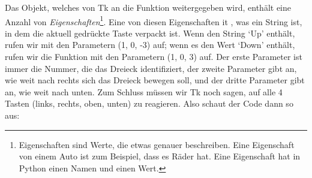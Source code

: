 Das Objekt, welches von Tk an die Funktion  weitergegeben wird, enthält eine Anzahl von \emph{Eigenschaften}\footnote{Eigenschaften sind Werte, die etwas genauer beschreiben. Eine Eigenschaft von einem Auto ist zum Beispiel, dass es Räder hat. Eine Eigenschaft hat in Python einen Namen und einen Wert.}. Eine von diesen Eigenschaften it , was ein String ist, in dem die aktuell gedrückte Taste verpackt ist. Wenn  den String `Up' enthält, rufen wir  mit den Parametern (1, 0, -3) auf; wenn es den Wert `Down' enthält, rufen wir die Funktion mit den Parametern (1, 0, 3) auf. Der erste Parameter ist immer die Nummer, die das Dreieck identifiziert, der zweite Parameter gibt an, wie weit nach rechts sich das Dreieck bewegen soll, und der dritte Parameter gibt an, wie weit nach unten. Zum Schluss müssen wir Tk noch sagen, auf alle 4 Tasten (links, rechts, oben, unten) zu reagieren. Also schaut der Code dann so aus:

